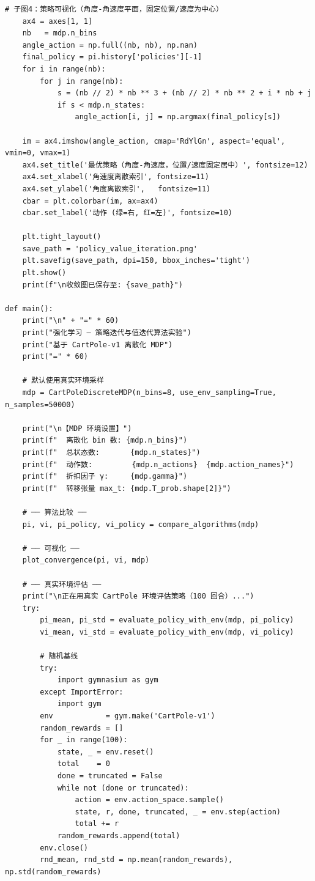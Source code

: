 \documentclass[12pt,a4paper]{article}
\begin{document}
\begin{lstlisting}[caption={策略迭代与值迭代算法完整实现（3.py）}]
    # 子图4：策略可视化（角度-角速度平面，固定位置/速度为中心）
    ax4 = axes[1, 1]
    nb   = mdp.n_bins
    angle_action = np.full((nb, nb), np.nan)
    final_policy = pi.history['policies'][-1]
    for i in range(nb):
        for j in range(nb):
            s = (nb // 2) * nb ** 3 + (nb // 2) * nb ** 2 + i * nb + j
            if s < mdp.n_states:
                angle_action[i, j] = np.argmax(final_policy[s])

    im = ax4.imshow(angle_action, cmap='RdYlGn', aspect='equal', vmin=0, vmax=1)
    ax4.set_title('最优策略（角度-角速度，位置/速度固定居中）', fontsize=12)
    ax4.set_xlabel('角速度离散索引', fontsize=11)
    ax4.set_ylabel('角度离散索引',   fontsize=11)
    cbar = plt.colorbar(im, ax=ax4)
    cbar.set_label('动作 (绿=右, 红=左)', fontsize=10)

    plt.tight_layout()
    save_path = 'policy_value_iteration.png'
    plt.savefig(save_path, dpi=150, bbox_inches='tight')
    plt.show()
    print(f"\n收敛图已保存至: {save_path}")

def main():
    print("\n" + "=" * 60)
    print("强化学习 — 策略迭代与值迭代算法实验")
    print("基于 CartPole-v1 离散化 MDP")
    print("=" * 60)

    # 默认使用真实环境采样
    mdp = CartPoleDiscreteMDP(n_bins=8, use_env_sampling=True, n_samples=50000)

    print("\n【MDP 环境设置】")
    print(f"  离散化 bin 数: {mdp.n_bins}")
    print(f"  总状态数:       {mdp.n_states}")
    print(f"  动作数:         {mdp.n_actions}  {mdp.action_names}")
    print(f"  折扣因子 γ:     {mdp.gamma}")
    print(f"  转移张量 max_t: {mdp.T_prob.shape[2]}")

    # ── 算法比较 ──
    pi, vi, pi_policy, vi_policy = compare_algorithms(mdp)

    # ── 可视化 ──
    plot_convergence(pi, vi, mdp)

    # ── 真实环境评估 ──
    print("\n正在用真实 CartPole 环境评估策略（100 回合）...")
    try:
        pi_mean, pi_std = evaluate_policy_with_env(mdp, pi_policy)
        vi_mean, vi_std = evaluate_policy_with_env(mdp, vi_policy)

        # 随机基线
        try:
            import gymnasium as gym
        except ImportError:
            import gym
        env            = gym.make('CartPole-v1')
        random_rewards = []
        for _ in range(100):
            state, _ = env.reset()
            total    = 0
            done = truncated = False
            while not (done or truncated):
                action = env.action_space.sample()
                state, r, done, truncated, _ = env.step(action)
                total += r
            random_rewards.append(total)
        env.close()
        rnd_mean, rnd_std = np.mean(random_rewards), np.std(random_rewards)


\end{lstlisting}
\end{document}
